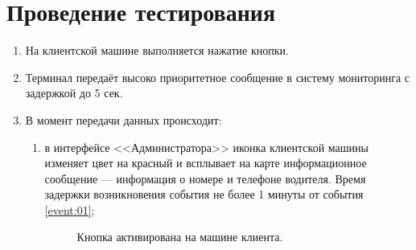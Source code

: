 \documentclass[russian,utf8,12pt,emptystyle]{eskdtext}
\begin{document}
\section{Проведение тестирования}
\begin{enumerate}
\item На клиентской машине выполняется нажатие кнопки.
\item Терминал передаёт высоко приоритетное сообщение в систему мониторинга с задержкой до 5 сек.\label{event:01}

\item В момент передачи данных происходит:
\begin{enumerate}
\item в интерфейсе <<Администратора>> иконка клиентской машины изменяет цвет на красный и всплывает на карте информационное сообщение --- информация о номере и телефоне водителя. Время задержки возникновения события не более 1 минуты от события \ref{event:01};
\newpage
\begin{figure}[h]
\begin{center}
\end{center}
\caption{Кнопка активирована на машине клиента.}
\label{ris:image5}
\begin{center}

\end{center}
\end{figure}
\end{enumerate}
\end{enumerate}
\end{document}
